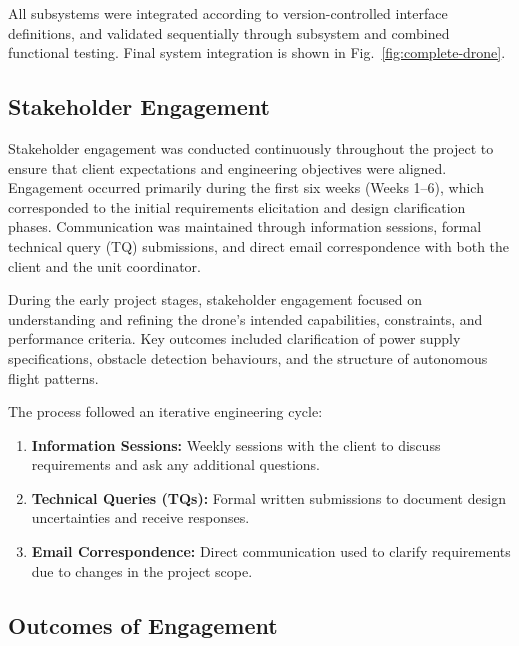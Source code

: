 \noindent All subsystems were integrated according to version-controlled interface definitions, and validated sequentially through subsystem and combined functional testing. Final system integration is shown in Fig.~\ref{fig:complete-drone}.



\subsection{Stakeholder Engagement}
Stakeholder engagement was conducted continuously throughout the project to ensure that client expectations and engineering objectives were aligned. Engagement occurred primarily during the first six weeks (Weeks 1–6), which corresponded to the initial requirements elicitation and design clarification phases. Communication was maintained through information sessions, formal technical query (TQ) submissions, and direct email correspondence with both the client and the unit coordinator.

During the early project stages, stakeholder engagement focused on understanding and refining the drone’s intended capabilities, constraints, and performance criteria. Key outcomes included clarification of power supply specifications, obstacle detection behaviours, and the structure of autonomous flight patterns. 

The process followed an iterative engineering cycle:
\begin{enumerate}
    \item \textbf{Information Sessions:} Weekly sessions with the client to discuss requirements and ask any additional questions.
    \item \textbf{Technical Queries (TQs):} Formal written submissions to document design uncertainties and receive responses.
    \item \textbf{Email Correspondence:} Direct communication used to clarify requirements due to changes in the project scope.
\end{enumerate}

\subsection{Outcomes of Engagement}

